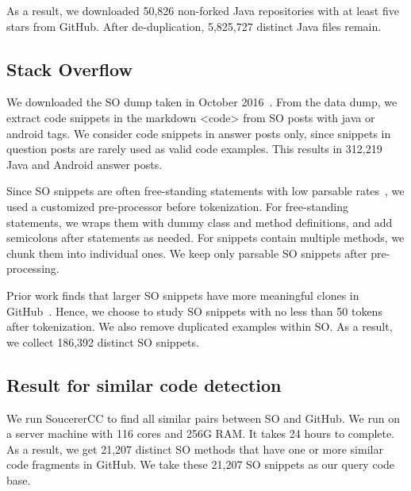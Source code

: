 As a result, we downloaded 50,826 non-forked Java repositories with at least five stars from GitHub. After de-duplication, 5,825,727 distinct Java files remain.


\subsection{Stack Overflow}
We downloaded the SO dump taken in October 2016~\cite{stackexchange}. From the data dump, we extract code snippets in the markdown {\ttt <code>} from SO posts with {\ttt java} or {\ttt android} tags.
We consider code snippets in answer posts only, since snippets in question posts are rarely used as valid code examples. This results in 312,219 Java and Android answer posts.

Since SO snippets are often free-standing statements with low parsable rates~\cite{yang2016query}, we used a customized pre-processor before tokenization. For free-standing statements, we wraps them with dummy class and method definitions, and add semicolons after statements as needed. For snippets contain multiple methods, we chunk them into individual ones. We keep only parsable SO snippets after pre-processing.

Prior work finds that larger SO snippets have more meaningful clones in GitHub~\cite{yang2017stack}. Hence, we choose to study SO snippets with no less than 50 tokens after tokenization. We also remove duplicated examples within SO. As a result, we collect 186,392 distinct SO snippets.

\subsection{Result for similar code detection}
We run SoucererCC to find all similar pairs between SO and GitHub. We run on a server machine with 116 cores and 256G RAM. It takes 24 hours to complete. As a result, we get 21,207 distinct SO methods that have one or more similar code fragments in GitHub. We take these 21,207 SO snippets as our query code base.

